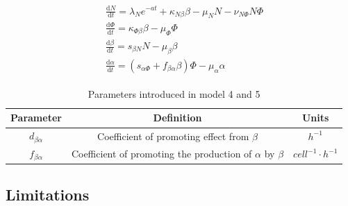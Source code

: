 \begin{align}
    \label{eq:model5}
    \begin{split}
        &\frac{\mathrm{d} N}{\mathrm{d} t}=\lambda_Ne^{-at}+\kappa_{N\beta}\beta-\mu_NN-\nu_{N\Phi}N\Phi\\
        &\frac{\mathrm{d} \Phi}{\mathrm{d} t}=\kappa_{\Phi\beta}\beta-\mu_\Phi\Phi\\
        &\frac{\mathrm{d} \beta}{\mathrm{d} t}=s_{\beta N}N-\mu_\beta\beta\\
        &\frac{\mathrm{d} \alpha}{\mathrm{d} t}=(s_{\alpha\Phi}+f_{\beta\alpha}\beta)\Phi-\mu_\alpha\alpha
    \end{split}
\end{align}
\begin{table}[h!]
    \centering
    \begin{tabular}{|c c c|}
        \hline
        Parameter         & Definition                                                     & Units                    \\ [0.5ex]
        \hline\hline
        $d_{\beta\alpha}$ & Coefficient of promoting effect from $\beta$                   & $h^{-1}$                 \\
        \hline
        $f_{\beta\alpha}$ & Coefficient of promoting the production of $\alpha$ by $\beta$ & $cell^{-1}\cdotp h^{-1}$ \\
        \hline
    \end{tabular}
    \caption{Parameters introduced in model 4 and 5}
    \label{table:m45}
\end{table}







\subsection{Limitations}

